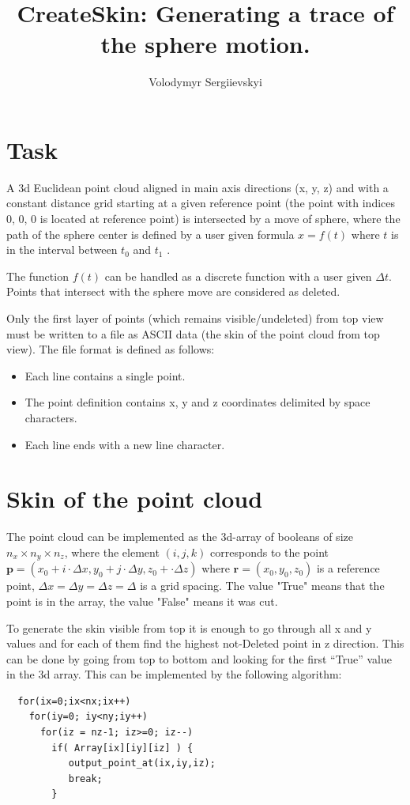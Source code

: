 \documentclass[12pt]{article}
\title{
  CreateSkin: Generating a trace of the sphere motion.
}
\author{ Volodymyr Sergiievskyi}
\begin{document}
\maketitle

\section{Task}
A 3d Euclidean point cloud aligned in main axis directions (x, y, z) and with a constant distance grid starting at a given reference point (the point with indices 0, 0, 0 is located at reference point) is intersected by a move of sphere,
 where the path of the sphere center is defined by a user given formula $x = f (t)$ where $t$ is in the interval between $t_0$ and $t_1$ . 
 
 The function $f(t)$ can
be handled as a discrete function with a user given $\Delta t$.
 Points that intersect with the sphere move are considered as deleted.


 Only the first layer of points (which remains visible/undeleted) from top view must be written
to a file as ASCII data (the skin of the point cloud from top view). The file
format is defined as follows:

\begin{itemize}
  \item Each line contains a single point.
  \item The point definition contains x, y and z coordinates delimited by space characters.
  \item Each line ends with a new line character.
\end{itemize}

\section{Skin of the point cloud}


The point cloud can be implemented as the 3d-array of booleans of size $n_x \times n_y \times n_z$, where the element $(i,j,k)$ corresponds to the point 
$
  \mathbf p = ( x_0 + i \cdot \Delta x , y_0 + j \cdot \Delta y, z_0 + \cdot \Delta z ) 
$
where $\mathbf r = (x_0,y_0,z_0) $ is a reference point,
$\Delta x = \Delta y = \Delta z = \Delta $ is a grid spacing.
The value "True" means that the point is in the array, the value "False" means it was cut.

To generate the skin visible from top it is enough to go through all x and y values and for each of them find the highest not-Deleted point in z direction. 
This can be done by going from top to bottom and looking for the first ``True'' value in the 3d array.
This can be implemented by the following algorithm:
\begin{verbatim}
  for(ix=0;ix<nx;ix++)
    for(iy=0; iy<ny;iy++)
      for(iz = nz-1; iz>=0; iz--)
        if( Array[ix][iy][iz] ) { 
           output_point_at(ix,iy,iz); 
           break; 
        }
\end{verbatim}
\end{document}
